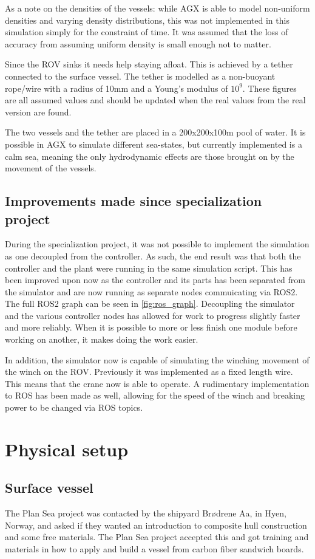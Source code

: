 \documentclass[class=article, crop=false]{standalone}
\begin{document}
As a note on the densities of the vessels: while AGX is able to model non-uniform densities and varying density distributions, this was not implemented in this simulation simply for the constraint of time. It was assumed that the loss of accuracy from assuming uniform density is small enough not to matter.

Since the ROV sinks it needs help staying afloat. This is achieved by a tether connected to the surface vessel. The tether is modelled as a non-buoyant rope/wire with a radius of 10mm and a Young's modulus of \(10^9\). These figures are all assumed values and should be updated when the real values from the real version are found.

The two vessels and the tether are placed in a 200x200x100m pool of water. It is possible in AGX to simulate different sea-states, but currently implemented is a calm sea, meaning the only hydrodynamic effects are those brought on by the movement of the vessels.


\subsection{Improvements made since specialization project}
\label{sec:simulation_work}
During the specialization project, it was not possible to implement the simulation as one decoupled from the controller. As such, the end result was that both the controller and the plant were running in the same simulation script. This has been improved upon now as the controller and its parts has been separated from the simulator and are now running as separate nodes commuicating via ROS2. The full ROS2 graph can be seen in \cref{fig:ros_graph}. Decoupling the simulator and the various controller nodes has allowed for work to progress slightly faster and more reliably. When it is possible to more or less finish one module before working on another, it makes doing the work easier.

In addition, the simulator now is capable of simulating the winching movement of the winch on the ROV. Previously it was implemented as a fixed length wire. This means that the crane now is able to operate. A rudimentary implementation to ROS has been made as well, allowing for the speed of the winch and breaking power to be changed via ROS topics.

\section{Physical setup}
\subsection{Surface vessel}
The Plan Sea project was contacted by the shipyard Brødrene Aa, in Hyen, Norway, and asked if they wanted an introduction to composite hull construction and some free materials. The Plan Sea project accepted this and got training and materials in how to apply and build a vessel from carbon fiber sandwich boards.
\end{document}
